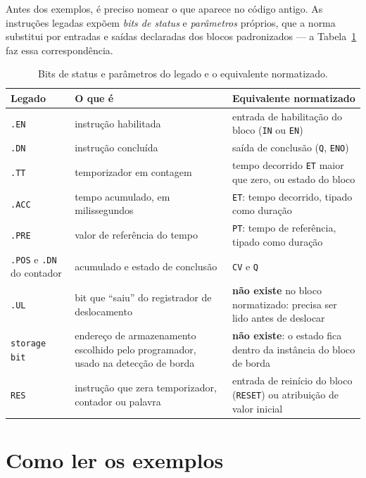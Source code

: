 Antes dos exemplos, é preciso nomear o que aparece no código antigo. As instruções legadas expõem
\emph{bits de status} e \emph{parâmetros} próprios, que a norma substitui por entradas e saídas
declaradas dos blocos padronizados --- a Tabela~\ref{tab:bits-status} faz essa correspondência.

\begin{table}[H]
  \centering
  \caption{Bits de status e parâmetros do legado e o equivalente normatizado.}
  \label{tab:bits-status}
  \begin{tabular}{p{2.5cm} p{5.0cm} p{6.8cm}}
    \toprule
    Legado & O que é & Equivalente normatizado \\
    \midrule
    \texttt{.EN} & instrução habilitada & entrada de habilitação do bloco (\texttt{IN} ou
      \texttt{EN}) \\
    \addlinespace
    \texttt{.DN} & instrução concluída & saída de conclusão (\texttt{Q}, \texttt{ENO}) \\
    \addlinespace
    \texttt{.TT} & temporizador em contagem & tempo decorrido \texttt{ET} maior que zero, ou estado do
      bloco \\
    \addlinespace
    \texttt{.ACC} & tempo acumulado, em milissegundos & \texttt{ET}: tempo decorrido, tipado como
      duração \\
    \addlinespace
    \texttt{.PRE} & valor de referência do tempo & \texttt{PT}: tempo de referência, tipado como
      duração \\
    \addlinespace
    \texttt{.POS} e \texttt{.DN} do contador & acumulado e estado de conclusão & \texttt{CV} e
      \texttt{Q} \\
    \addlinespace
    \texttt{.UL} & bit que ``saiu'' do registrador de deslocamento & \textbf{não existe} no bloco
      normatizado: precisa ser lido antes de deslocar \\
    \addlinespace
    \texttt{storage bit} & endereço de armazenamento escolhido pelo programador, usado na detecção de
      borda & \textbf{não existe}: o estado fica dentro da instância do bloco de borda \\
    \addlinespace
    \texttt{RES} & instrução que zera temporizador, contador ou palavra & entrada de reinício do bloco
      (\texttt{RESET}) ou atribuição de valor inicial \\
    \bottomrule
  \end{tabular}
\end{table}

\section{Como ler os exemplos}

